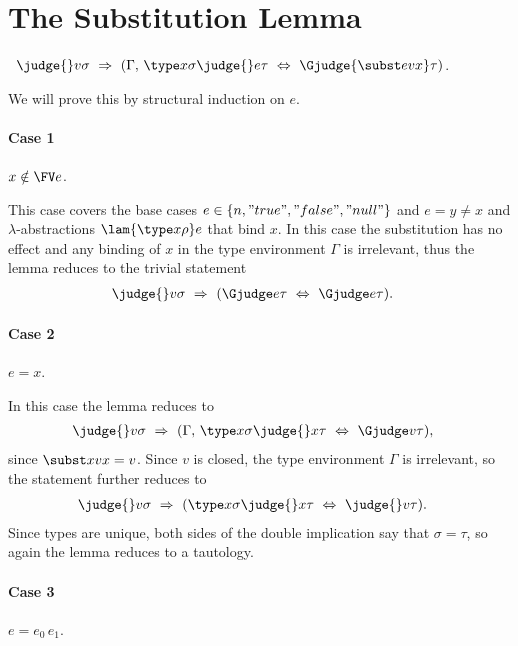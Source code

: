 \section{The Substitution Lemma}

\begin{lemma}\
$\judge{}v\sigma\ \Rightarrow\ (\Gamma,\,\type x\sigma\judge{}e\tau\ \Leftrightarrow\ \Gjudge{\subst evx}\tau)$.
\end{lemma}
We will prove this by structural induction on $e$.

\paragraph{Case 1} $x\notin\FV e$.

This case covers the base cases $e\in\{n, "true", "false", "null"\}$ and $e = y\neq x$ and $\lambda$-abstractions $\lam{\type x\rho}e$ that bind $x$. In this case the substitution has no effect and any binding of $x$ in the type environment $\Gamma$ is irrelevant, thus the lemma reduces to the trivial statement
\begin{align*}
\judge{}v\sigma\ &\Rightarrow\ (\Gjudge e\tau\ \Leftrightarrow\ \Gjudge e\tau).
\end{align*}

\paragraph{Case 2} $e = x$.

In this case the lemma reduces to
\begin{align*}
\judge{}v\sigma\ &\Rightarrow\ (\Gamma,\,\type x\sigma\judge{}x\tau\ \Leftrightarrow\ \Gjudge v\tau),
\end{align*}
since $\subst xvx=v$. Since $v$ is closed, the type environment $\Gamma$ is irrelevant, so the statement further reduces to
\begin{align*}
\judge{}v\sigma\ &\Rightarrow\ (\type x\sigma\judge{}x\tau\ \Leftrightarrow\ \judge{}v\tau).
\end{align*}
Since types are unique, both sides of the double implication say that $\sigma=\tau$, so again the lemma reduces to a tautology.

\paragraph{Case 3} $e = e_0\,e_1$.

